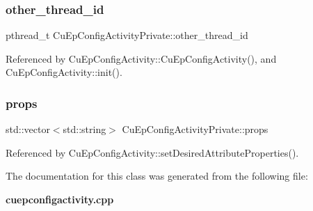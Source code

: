 \subsubsection{other\+\_\+thread\+\_\+id}
{\footnotesize\ttfamily pthread\+\_\+t Cu\+Ep\+Config\+Activity\+Private\+::other\+\_\+thread\+\_\+id}



Referenced by Cu\+Ep\+Config\+Activity\+::\+Cu\+Ep\+Config\+Activity(), and Cu\+Ep\+Config\+Activity\+::init().

\mbox{\label{classCuEpConfigActivityPrivate_a71e5bb7d57024f473457208bd13436f5}} 
\subsubsection{props}
{\footnotesize\ttfamily std\+::vector$<$std\+::string$>$ Cu\+Ep\+Config\+Activity\+Private\+::props}



Referenced by Cu\+Ep\+Config\+Activity\+::set\+Desired\+Attribute\+Properties().



The documentation for this class was generated from the following file\+:\begin{DoxyCompactItemize}
\item 
\textbf{ cuepconfigactivity.\+cpp}\end{DoxyCompactItemize}
